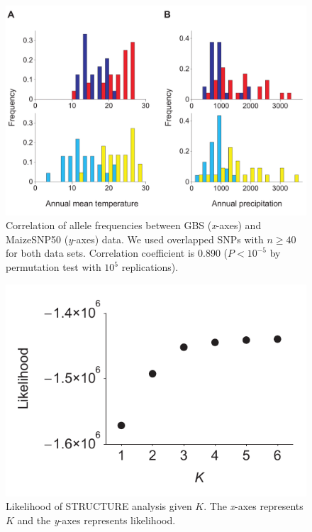 \renewcommand{\arraystretch}{1}

\begin{figure}[t]
  \begin{center}
    \includegraphics[width=0.6\columnwidth]{fig/bioclm.pdf}
    \caption{Correlation of allele frequencies between GBS (\emph{x}-axes) and MaizeSNP50 (\emph{y}-axes) data.  We used overlapped SNPs with $n\geq40$ for both data sets.  Correlation coefficient is 0.890 ($P<10^{-5}$ by permutation test with $10^5$ replications).}
    \label{supp:colfreq}
  \end{center}
\end{figure}

\begin{figure}[t]
  \begin{center}
    \includegraphics[width=0.4\columnwidth]{fig/kk.pdf}
    \caption{Likelihood of STRUCTURE analysis given $K$.  The \emph{x}-axes represents $K$ and the \emph{y}-axes represents likelihood.}
    \label{fig:correl_freq}
  \end{center}
\end{figure}

